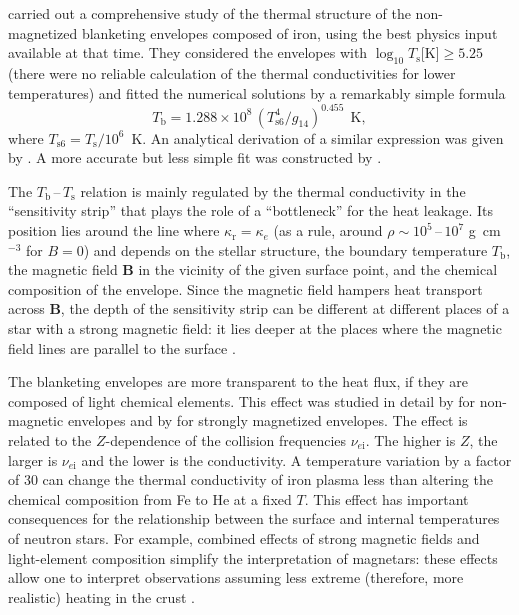 \documentclass[smallextended]{svjour3}       %
\newcommand{\beq}{\begin{equation}}
\newcommand{\eeq}{\end{equation}}
\newcommand{\gcc}{\mbox{g~cm$^{-3}$}}
\newcommand{\TbTs}{$T_\mathrm{b}$\,--\,$T_\mathrm{s}$}
\newcommand{\Ts}{T_\mathrm{s}}
\begin{document}
\citet{GPE83} carried out a
comprehensive study of the thermal structure of the
non-magnetized blanketing envelopes composed of iron, using
the best physics input available at that time. They
considered the envelopes with $\log_{10} \Ts$[K]$ \geq 5.25$ (there
were no reliable calculation of the thermal conductivities for lower temperatures) 
and fitted the numerical solutions by a remarkably simple formula
\beq
     T_\mathrm{b} = 1.288 \times 10^8 \,
     (T_\mathrm{s6}^4/g_{14})^{0.455}~~\mathrm{K},
\label{therm-GPE}
\eeq
where $T_\mathrm{s6}=\Ts/10^6$~K.
An analytical derivation of a similar expression
was given by \citet{VP01}. A more accurate but less simple
fit was constructed by \citet{PCY97}.

The \TbTs{} relation is mainly regulated by the thermal
conductivity in the ``sensitivity strip'' \citep{GPE83} that
plays the role of a ``bottleneck'' for the heat leakage. Its
position lies around the line where
$\kappa_\mathrm{r}=\kappa_e$ (as a rule, around
$\rho\sim10^5$\,--\,$10^7$ \gcc{} for $B=0$) and depends on
the stellar structure, the boundary temperature
$T_\mathrm{b}$, the magnetic field $\bm{B}$ in the vicinity of
the given surface point, and the chemical composition of the
envelope. Since the magnetic field hampers heat transport
across $\bm{B}$, the depth of the sensitivity strip can be
different at different places of a star with a strong
magnetic field: it lies deeper at the places where the
magnetic field lines are parallel to the surface
\citep{VP01}.

The blanketing envelopes are more transparent to the heat
flux, if they are composed of light chemical elements. This
effect was studied in detail by \citet{PCY97} for
non-magnetic envelopes and by \citet{Potekhin-ea03} for strongly
magnetized envelopes. The effect is related to  the $Z$-dependence
of the collision frequencies  $\nu_{e\mathrm{i}}$. The higher
is $Z$, the larger is $\nu_{e\mathrm{i}}$ and the lower is the
conductivity. A temperature variation by a factor of 30 can
change the thermal conductivity of iron plasma less 
than altering the chemical composition from  Fe to He
at a fixed $T$. This effect has important consequences  for
the relationship between the surface and internal
temperatures  of neutron stars.
For example, combined effects of strong magnetic fields and
light-element composition simplify the interpretation of
magnetars: these effects allow one to interpret
observations assuming less extreme (therefore, more
realistic) heating in the crust \citep{Kaminker-ea09,PonsMG09,vigano13}.
\end{document}
